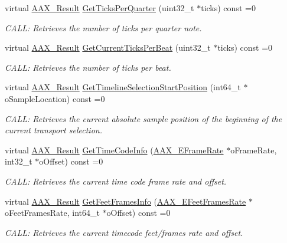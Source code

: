 \begin{DoxyCompactItemize}
virtual \mbox{\hyperlink{a00392_a4d8f69a697df7f70c3a8e9b8ee130d2f}{A\+A\+X\+\_\+\+Result}} \mbox{\hyperlink{a01885_aa02b3ec8fd6059240260b67c256d9da8}{Get\+Ticks\+Per\+Quarter}} (uint32\+\_\+t $\ast$ticks) const =0
\begin{DoxyCompactList}\small\item\em C\+A\+LL\+: Retrieves the number of ticks per quarter note. \end{DoxyCompactList}\item 
virtual \mbox{\hyperlink{a00392_a4d8f69a697df7f70c3a8e9b8ee130d2f}{A\+A\+X\+\_\+\+Result}} \mbox{\hyperlink{a01885_aa5cfd6fef3e4950583ec1e050be692ec}{Get\+Current\+Ticks\+Per\+Beat}} (uint32\+\_\+t $\ast$ticks) const =0
\begin{DoxyCompactList}\small\item\em C\+A\+LL\+: Retrieves the number of ticks per beat. \end{DoxyCompactList}\item 
virtual \mbox{\hyperlink{a00392_a4d8f69a697df7f70c3a8e9b8ee130d2f}{A\+A\+X\+\_\+\+Result}} \mbox{\hyperlink{a01885_a639677fc4237183baac85d00f1a5f6d5}{Get\+Timeline\+Selection\+Start\+Position}} (int64\+\_\+t $\ast$o\+Sample\+Location) const =0
\begin{DoxyCompactList}\small\item\em C\+A\+LL\+: Retrieves the current absolute sample position of the beginning of the current transport selection. \end{DoxyCompactList}\item 
virtual \mbox{\hyperlink{a00392_a4d8f69a697df7f70c3a8e9b8ee130d2f}{A\+A\+X\+\_\+\+Result}} \mbox{\hyperlink{a01885_a3babe261ec37aa4a61c4cbd74f123bc0}{Get\+Time\+Code\+Info}} (\mbox{\hyperlink{a00491_a1271a51553bf508de59864334111aa8f}{A\+A\+X\+\_\+\+E\+Frame\+Rate}} $\ast$o\+Frame\+Rate, int32\+\_\+t $\ast$o\+Offset) const =0
\begin{DoxyCompactList}\small\item\em C\+A\+LL\+: Retrieves the current time code frame rate and offset. \end{DoxyCompactList}\item 
virtual \mbox{\hyperlink{a00392_a4d8f69a697df7f70c3a8e9b8ee130d2f}{A\+A\+X\+\_\+\+Result}} \mbox{\hyperlink{a01885_a0c410bc1dc478785c04cde39891ae587}{Get\+Feet\+Frames\+Info}} (\mbox{\hyperlink{a00491_a8a0c9dafef741a26ee8c06f7285a0dfa}{A\+A\+X\+\_\+\+E\+Feet\+Frames\+Rate}} $\ast$o\+Feet\+Frames\+Rate, int64\+\_\+t $\ast$o\+Offset) const =0
\begin{DoxyCompactList}\small\item\em C\+A\+LL\+: Retrieves the current timecode feet/frames rate and offset. \end{DoxyCompactList}\item 

\end{DoxyCompactItemize}
